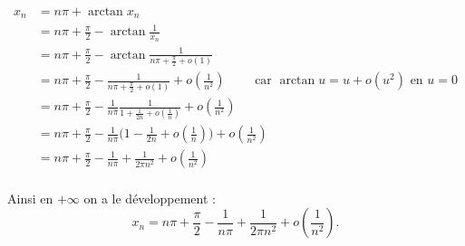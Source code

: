 {\begin{enumerate}
{\begin{align*}
x_n 
 & = n\pi + \arctan x_n \\
 & = n\pi +\frac \pi 2 - \arctan \frac{1}{x_n} \\
 & = n\pi +\frac \pi 2 - \arctan \frac{1}{n\pi +\frac \pi 2 + o(1)} \\
 & = n\pi +\frac \pi 2 - \frac{1}{n\pi +\frac \pi 2 + o(1)} +o(\frac1{n^2}) \qquad \text{ car } \arctan u = u + o(u^2) \text{ en } u=0\\
 & = n\pi +\frac \pi 2 - \frac{1}{n\pi} \frac{1}{1+\frac{1}{2n} + o(\frac1n)}+o(\frac1{n^2}) \\
 & = n\pi +\frac \pi 2 - \frac{1}{n\pi}\big(1-\frac{1}{2n} + o(\frac1n) \big) +o(\frac1{n^2})\\
 & = n\pi +\frac \pi 2 -\frac{1}{n\pi} + \frac{1}{2\pi n^2} + o(\frac1{n^2}) \\
\end{align*}

Ainsi en $+\infty$ on a le développement :
$$x_n  = n\pi +\frac \pi 2 -\frac{1}{n\pi} + \frac{1}{2\pi n^2} + o(\frac1{n^2}).$$}
\end{enumerate}
}
